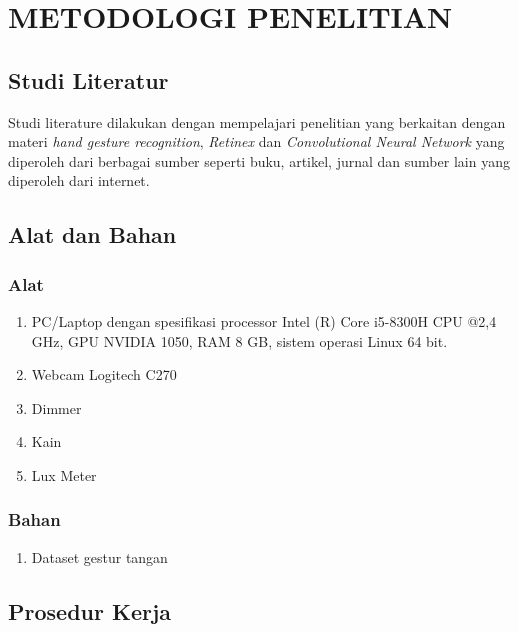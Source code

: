 \chapter{METODOLOGI PENELITIAN}
\section{Studi Literatur}
Studi literature dilakukan dengan mempelajari penelitian yang berkaitan dengan materi \emph{hand gesture recognition}, \emph{Retinex} dan \emph{Convolutional Neural Network} yang  diperoleh dari berbagai sumber seperti buku, artikel, jurnal dan sumber lain yang diperoleh dari internet.
\section{Alat dan Bahan}
\subsection{Alat}
\begin{enumerate}
\item PC/Laptop dengan spesifikasi processor Intel (R) Core i5-8300H CPU @2,4 GHz, GPU NVIDIA 1050, RAM 8 GB, sistem operasi Linux 64 bit.
\item Webcam Logitech C270
\item Dimmer
\item Kain	
\item Lux Meter
\end{enumerate}
\subsection{Bahan}
\begin{enumerate}
	\item Dataset gestur tangan 
\end{enumerate}
\section{Prosedur Kerja}
